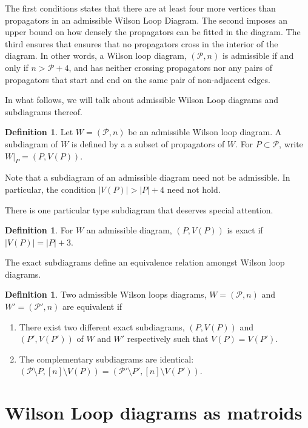 \documentclass[11pt]{article}
\newcommand{\cP}{\mathcal{P}}
\theoremstyle{remark}
\theoremstyle{definition}
\newtheorem{dfn}[thm]{Definition}
\begin{document}
The first conditions states that there are at least four more vertices than propagators in an admissible Wilson Loop Diagram. The second imposes an upper bound on how densely the propagators can be fitted in the diagram. The third ensures that ensures that no propagators cross in the interior of the diagram. In other words, a Wilson loop diagram, $(\cP, n)$ is admissible if and only if $n > \cP +4$, and has neither crossing propagators nor any pairs of propagators that start and end on the same pair of non-adjacent edges.

In what follows, we will talk about admissible Wilson Loop diagrams and subdiagrams thereof.

\begin{dfn} \label{subdiagramdfn}
Let $W = (\cP, n)$ be an admissible Wilson loop diagram. A subdiagram of $W$ is defined by a a subset of propagators of $W$. For $P \subset \cP$, write $W|_P = (P, V(P))$. 
\end{dfn}

Note that a subdiagram of an admissible diagram need not be admissible. In particular, the condition $|V(P)| > |P| +4$ need not hold. 

There is one particular type subdiagram that deserves special attention. 

\begin{dfn}
For $W$ an admissible diagram, $(P, V(P))$ is exact if $|V(P)| = |P| + 3$. 
\end{dfn}

The exact subdiagrams define an equivalence relation amongst Wilson loop diagrams.

\begin{dfn}\label{equivdfn}
Two admissible Wilson loops diagrams, $W = (\cP, n)$ and $W'= (\cP', n)$ are equivalent if
\begin{enumerate}
\item There exist two different exact subdiagrams, $(P, V(P))$ and $(P', V(P'))$ of $W$ and $W'$ respectively such that $V(P) =  V(P')$.
\item The complementary subdiagrams are identical: $(\cP \setminus P, [n] \setminus V(P)) = (\cP' \setminus P', [n] \setminus V(P'))$.
\end{enumerate}
\end{dfn}


\section{Wilson Loop diagrams as matroids}
\end{document}
